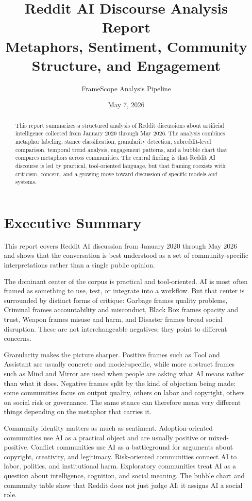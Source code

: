 \documentclass[11pt]{article}
\title{Reddit AI Discourse Analysis Report\\Metaphors, Sentiment, Community Structure, and Engagement}
\author{FrameScope Analysis Pipeline}
\date{May 7, 2026}
\begin{document}
\maketitle

\begin{abstract}
This report summarizes a structured analysis of Reddit discussions about artificial intelligence collected from January 2020 through May 2026. The analysis combines metaphor labeling, stance classification, granularity detection, subreddit-level comparison, temporal trend analysis, engagement patterns, and a bubble chart that compares metaphors across communities. The central finding is that Reddit AI discourse is led by practical, tool-oriented language, but that framing coexists with criticism, concern, and a growing move toward discussion of specific models and systems.
\end{abstract}

\section{Executive Summary}
This report covers Reddit AI discussion from January 2020 through May 2026 and shows that the conversation is best understood as a set of community-specific interpretations rather than a single public opinion.

The dominant center of the corpus is practical and tool-oriented. AI is most often framed as something to use, test, or integrate into a workflow. But that center is surrounded by distinct forms of critique: Garbage frames quality problems, Criminal frames accountability and misconduct, Black Box frames opacity and trust, Weapon frames misuse and harm, and Disaster frames broad social disruption. These are not interchangeable negatives; they point to different concerns.

Granularity makes the picture sharper. Positive frames such as Tool and Assistant are usually concrete and model-specific, while more abstract frames such as Mind and Mirror are used when people are asking what AI means rather than what it does. Negative frames split by the kind of objection being made: some communities focus on output quality, others on labor and copyright, others on social risk or governance. The same stance can therefore mean very different things depending on the metaphor that carries it.

Community identity matters as much as sentiment. Adoption-oriented communities use AI as a practical object and are usually positive or mixed-positive. Conflict communities use AI as a battleground for arguments about copyright, creativity, and legitimacy. Risk-oriented communities connect AI to labor, politics, and institutional harm. Exploratory communities treat AI as a question about intelligence, cognition, and social meaning. The bubble chart and community table show that Reddit does not just judge AI; it assigns AI a social role.
\end{document}
